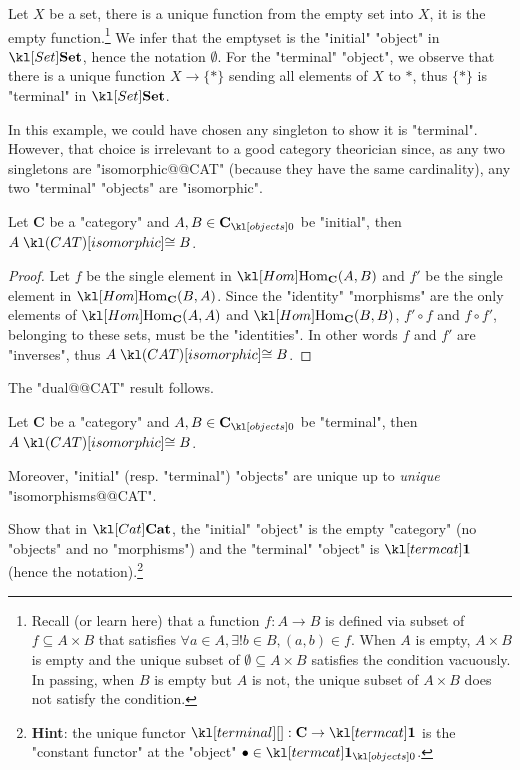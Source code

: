 \documentclass[main.tex]{subfiles}
\begin{document}
\begin{exmp}[$\catSet$]
	Let $X$ be a set, there is a unique function from the empty set into $X$, it is the empty function.\footnote{Recall (or learn here) that a function $f: A \rightarrow B$ is defined via subset of $f \subseteq A \times B$ that satisfies $\forall a \in A, \exists! b\in B, (a,b) \in f$. When $A$ is empty, $A \times B$ is empty and the unique subset of $\emptyset \subseteq A\times B$ satisfies the condition vacuously. In passing, when $B$ is empty but $A$ is not, the unique subset of $A \times B$ does not satisfy the condition.} We infer that the emptyset is the "initial" "object" in $\catSet$, hence the notation $\emptyset$. For the "terminal" "object", we observe that there is a unique function $X \rightarrow \{\ast\}$ sending all elements of $X$ to $\ast$, thus $\{\ast\}$ is "terminal" in $\catSet$.
\end{exmp}
In this example, we could have chosen any singleton to show it is "terminal". However, that choice is irrelevant to a good category theorician since, as any two singletons are "isomorphic@@CAT" (because they have the same cardinality), any two "terminal" "objects" are "isomorphic".
\begin{prop}
	Let $\mathbf{C}$ be a "category" and $A,B\in \obj{\mathbf{C}}$ be "initial", then $A \isoCAT B$.
\end{prop}
\begin{proof}
	Let $f$ be the single element in $\Hom_{\mathbf{C}}(A,B)$ and $f'$ be the single element in $\Hom_{\mathbf{C}}(B,A)$. Since the "identity" "morphisms" are the only elements of $\Hom_{\mathbf{C}}(A,A)$ and $\Hom_{\mathbf{C}}(B,B)$, $f' \circ f$ and $f\circ f'$, belonging to these sets, must be the "identities". In other words $f$ and $f'$ are "inverses", thus $A \isoCAT B$. 
\end{proof}
The "dual@@CAT" result follows.
\begin{prop}
	Let $\mathbf{C}$ be a "category" and $A,B \in \obj{\mathbf{C}}$ be "terminal", then $A \isoCAT B$.
\end{prop}
Moreover, "initial" (resp. "terminal") "objects" are unique up to \textit{unique} "isomorphisms@@CAT".%
\begin{exer}
	Show that in $\catCat$, the "initial" "object" is the empty "category" (no "objects" and no "morphisms") and the "terminal" "object" is $\termcat$ (hence the notation).\footnote{\textbf{Hint}: the unique functor $\termmorph:\mathbf{C} \rightarrow \termcat$ is the "constant functor" at the "object" $\bullet \in \obj{\termcat}$.}
\end{exer}
\end{document}
